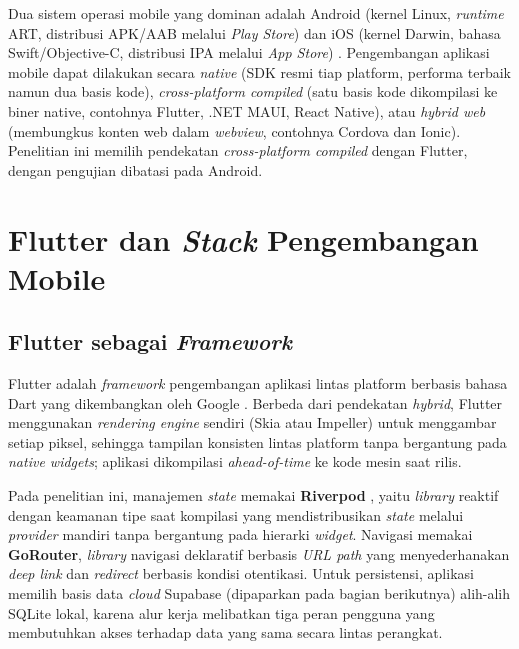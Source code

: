 Dua sistem operasi mobile yang dominan adalah Android (kernel Linux, \textit{runtime} ART, distribusi APK/AAB melalui \textit{Play Store}) dan iOS (kernel Darwin, bahasa Swift/Objective-C, distribusi IPA melalui \textit{App Store}) \citep{androidDevDocs2024,appleCoreML2024}. Pengembangan aplikasi mobile dapat dilakukan secara \textit{native} (SDK resmi tiap platform, performa terbaik namun dua basis kode), \textit{cross-platform compiled} (satu basis kode dikompilasi ke biner native, contohnya Flutter, .NET MAUI, React Native), atau \textit{hybrid web} (membungkus konten web dalam \textit{webview}, contohnya Cordova dan Ionic). Penelitian ini memilih pendekatan \textit{cross-platform compiled} dengan Flutter, dengan pengujian dibatasi pada Android.

\section{Flutter dan \textit{Stack} Pengembangan Mobile}
\label{sec:flutter}

\subsection{Flutter sebagai \textit{Framework}}

Flutter adalah \textit{framework} pengembangan aplikasi lintas platform berbasis bahasa Dart yang dikembangkan oleh Google \citep{flutterdoc2024}. Berbeda dari pendekatan \textit{hybrid}, Flutter menggunakan \textit{rendering engine} sendiri (Skia atau Impeller) untuk menggambar setiap piksel, sehingga tampilan konsisten lintas platform tanpa bergantung pada \textit{native widgets}; aplikasi dikompilasi \textit{ahead-of-time} ke kode mesin saat rilis.

Pada penelitian ini, manajemen \textit{state} memakai \textbf{Riverpod} \citep{riverpoddoc2024}, yaitu \textit{library} reaktif dengan keamanan tipe saat kompilasi yang mendistribusikan \textit{state} melalui \textit{provider} mandiri tanpa bergantung pada hierarki \textit{widget}. Navigasi memakai \textbf{GoRouter}, \textit{library} navigasi deklaratif berbasis \textit{URL path} yang menyederhanakan \textit{deep link} dan \textit{redirect} berbasis kondisi otentikasi. Untuk persistensi, aplikasi memilih basis data \textit{cloud} Supabase (dipaparkan pada bagian berikutnya) alih-alih SQLite lokal, karena alur kerja melibatkan tiga peran pengguna yang membutuhkan akses terhadap data yang sama secara lintas perangkat.

